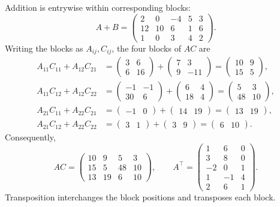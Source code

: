 \begin{solution}
Addition is entrywise within corresponding blocks:
\[
A+B=\left(\begin{array}{rrr|rr}2&0&-4&5&3\\12&10&6&1&6\\\hline1&0&3&4&2\end{array}\right).
\]
Writing the blocks as $A_{ij},C_{ij}$, the four blocks of $AC$ are
\begin{align*}
A_{11}C_{11}+A_{12}C_{21}
 &=\begin{pmatrix}3&6\\6&16\end{pmatrix}
   +\begin{pmatrix}7&3\\9&-11\end{pmatrix}
   =\begin{pmatrix}10&9\\15&5\end{pmatrix},\\
A_{11}C_{12}+A_{12}C_{22}
 &=\begin{pmatrix}-1&-1\\30&6\end{pmatrix}
   +\begin{pmatrix}6&4\\18&4\end{pmatrix}
   =\begin{pmatrix}5&3\\48&10\end{pmatrix},\\
A_{21}C_{11}+A_{22}C_{21}&=\begin{pmatrix}-1&0\end{pmatrix}
 +\begin{pmatrix}14&19\end{pmatrix}=\begin{pmatrix}13&19\end{pmatrix},\\
A_{21}C_{12}+A_{22}C_{22}&=\begin{pmatrix}3&1\end{pmatrix}
 +\begin{pmatrix}3&9\end{pmatrix}=\begin{pmatrix}6&10\end{pmatrix}.
\end{align*}
Consequently,
\[
AC=\left(\begin{array}{rr|rr}10&9&5&3\\15&5&48&10\\\hline13&19&6&10\end{array}\right),
\qquad
A^\top=\left(\begin{array}{rr|r}1&6&0\\3&8&0\\-2&0&1\\\hline1&-1&4\\2&6&1\end{array}\right).
\]
Transposition interchanges the block positions and transposes each block.
\end{solution}

